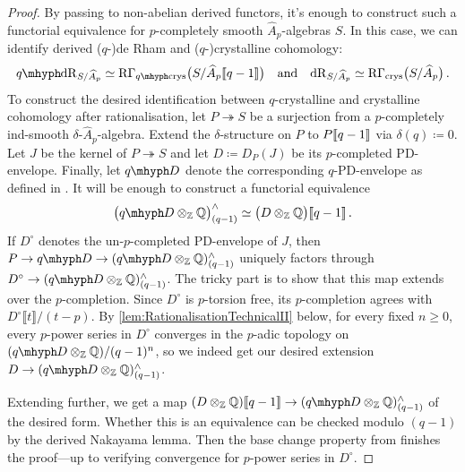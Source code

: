 \documentclass[DIV=12,numbers=enddot,leqno,bibliography=totoc]{scrartcl}
\begin{document}
	\begin{proof}
		By passing to non-abelian derived functors, it's enough to construct such a functorial equivalence for $p$-completely smooth $\widehat{A}_p$-algebras $S$. In this case, we can identify derived ($q$-)de Rham and ($q$-)crystalline cohomology:
		\begin{equation*}
			\qdeRham_{S/\smash{\widehat{A}}_p}\simeq \R\Gamma_\qcrys\bigl(S/\widehat{A}_p\qpower\bigr)\quad\text{and}\quad \deRham_{S/\smash{\widehat{A}}_p}\simeq \R\Gamma_\crys\bigl(S/\widehat{A}_p\bigr)\,.
		\end{equation*}
		To construct the desired identification between $q$-crystalline and crystalline cohomology after rationalisation, let $P\twoheadrightarrow S$ be a surjection from a $p$-completely ind-smooth $\delta$-$\widehat{A}_p$-algebra. Extend the $\delta$-structure on $P$ to $P\llbracket q-1\rrbracket$ via $\delta(q)\coloneqq 0$. Let $J$ be the kernel of $P\twoheadrightarrow S$ and let $D\coloneqq D_P(J)$ be its $p$-completed PD-envelope. Finally, let $\q D$ denote the corresponding $q$-PD-envelope as defined in \cite[Lemma~]{Prismatic}. It will be enough to construct a functorial equivalence
		\begin{equation*}
			\bigl(\q D\otimes_{\IZ}\IQ\bigr)_{(q-1)}^\complete\simeq \bigl(D\otimes_{\IZ}\IQ\bigr)\qpower\,.
		\end{equation*}
		If $D^\circ$ denotes the un-$p$-completed PD-envelope of $J$, then $P\rightarrow \q D\rightarrow (\q D\otimes_{\IZ}\IQ)_{(q-1)}^\complete$ uniquely factors through $D^\circ \rightarrow (\q D\otimes_{\IZ}\IQ)_{(q-1)}^\complete$. The tricky part is to show that this map extends over the $p$-completion. Since $D^\circ$ is $p$-torsion free, its $p$-completion agrees with $D^\circ\llbracket t\rrbracket/(t-p)$. By \cref{lem:RationalisationTechnicalII} below, for every fixed $n\geqslant 0$, every $p$-power series in $D^\circ$ converges in the $p$-adic topology on $(\q D\otimes_{\IZ}\IQ)/(q-1)^n$, so we indeed get our desired extension $D\rightarrow (\q D\otimes_{\IZ}\IQ)_{(q-1)}^\complete$.
		
		Extending further, we get a map $(D\otimes_{\IZ}\IQ)\qpower\rightarrow (\q D\otimes_{\IZ}\IQ)_{(q-1)}^\complete$ of the desired form. Whether this is an equivalence can be checked modulo $(q-1)$ by the derived Nakayama lemma. Then the base change property from \cite[Lemma~(3)]{Prismatic} finishes the proof---up to verifying convergence for $p$-power series in $D^\circ$.
	\end{proof}
	
\end{document}
